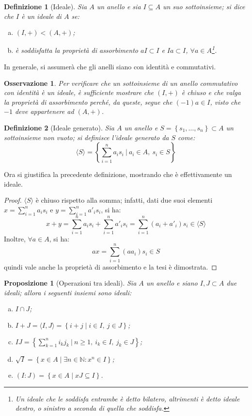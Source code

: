 \documentclass[11pt]{article}
\theoremstyle{style}
\newtheorem{definizione}{Definizione}[section]
\newtheorem{prop}{Proposizione}[section]
\newtheorem{osservazione}{Osservazione}[section]
\newenvironment{boxenv}[1][]{
    \begin{eqbox}[#1]
    }{
   \end{eqbox}
}
\numberwithin{equation}{subsection}
\begin{document}
\begin{definizione}
	[Ideale]
	Sia $A $ un anello e sia $I \subseteq A$ un suo sottoinsieme; si dice che $I$ \`e un ideale di $A$ se:
	\begin{enumerate}[(a).]
		\item $(I,+) < (A,+)$;
		\item \`e soddisfatta la propriet\`a di assorbimento $aI \subset I$ e $Ia \subset I$, $\forall a \in A$\footnote{Un ideale che le soddisfa entrambe \`e detto \textit{bilatero}, altrimenti \`e detto \textit{ideale destro}, o \textit{sinistro} a seconda di quella che soddisfa.}.
	\end{enumerate}
\end{definizione}
\begin{boxenv}[]
\centering	In generale, si assumer\`a che gli anelli siano con identit\`a e commutativi.
\end{boxenv}
\begin{osservazione}
Per verificare che un sottoinsieme di un anello commutativo con identit\`a \`e un ideale, \`e sufficiente mostrare che $(I,+)$ \`e chiuso e che valga la propriet\`a di assorbimento perch\'e, da queste, segue che $(-1)a \in I$, visto che $-1$ deve appartenere ad $(A,+)$.
\end{osservazione}
\begin{definizione}
	[Ideale generato]
	Sia $A$ un anello e $S=\left\{ s_1,\ldots,s_n \right\}  \subset A$ un sottoinsieme non vuoto; si definisce l'\textit{ideale generato} da $S$ come:
	\[
	\langle S \rangle= \left\{ \sum_{i=1}^{n} a_i s_i  \ \Bigg\lvert\ a_i \in A, \ s_i \in S \right\} 
	\] 
\end{definizione}
\noindent Ora si giustifica la precedente definizione, mostrando che \`e effettivamente un ideale.
\begin{proof}
	$\langle S \rangle$ \`e chiuso rispetto alla somma; infatti, dati due suoi elementi $x = \sum_{i=1}^{n} a_i s_i$ e $ y = \sum_{i=1}^{n} a'_i s_i$, si ha:
\[
x+y = \sum_{i=1}^{n} a_is_i + \sum_{i=1}^{n} a'_i s_i = \sum_{i=1}^{n} (a_i + a'_i) s_i \in \langle S \rangle
\] 
Inoltre, $\forall a \in A$, si ha:
\[
ax = \sum_{i=1}^{n}( a a_i) s_i \in S
\] 
quindi vale anche la propriet\`a di assorbimento e la tesi \`e dimostrata.
\end{proof}
\begin{prop}
	[Operazioni tra ideali]
	Sia $A$ un anello e siano $I,J \subset A$ due ideali; allora i seguenti insiemi sono ideali:
	\begin{enumerate}[(a).]
		\item $I\cap J$;
		\item $I+J = \langle I,J \rangle = \left\{ i + j  \mid i \in I, \ j \in J \right\} $;
		\item $IJ = \left\{ \sum_{k=1}^{n} i_k j_k\ \Big\lvert\ n\ge 1,\ i_k \in I, \ j_k \in J \right\} $;
		\item $\sqrt{I} = \left\{ x \in A  \mid \exists n \in \mathbb{N} : x^n \in I \right\} $;
		\item $(I:J) = \left\{ x \in A  \mid  xJ \subseteq I \right\} $.
	\end{enumerate}
\end{prop}
\end{document}
